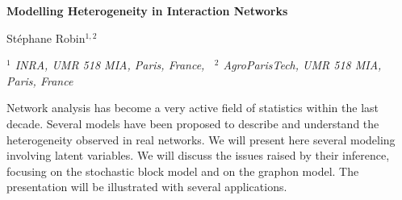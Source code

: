 \documentclass[11pt,a4paper]{article}
\newcommand{\abstracttitle}[1]{\begin{center} \begin{large} \textbf{#1} \end{large} \end{center}}
\newcommand{\authors}[1]{\begin{center} #1 \end{center}}
\newcommand{\affiliations}[1]{\begin{center} #1 \end{center}}
\begin{document}
\abstracttitle{Modelling Heterogeneity in Interaction Networks}
\authors{St\'ephane Robin{$^{1, 2}$}}
\affiliations{\it $^1$ INRA, UMR 518 MIA, Paris, France, \, $^2$ AgroParisTech, UMR 518 MIA, Paris, France}

Network analysis has become a very active field of statistics within the last decade. Several models have been proposed to describe and understand the heterogeneity observed in real networks. We will present here several modeling involving latent variables. We will discuss the issues raised by their inference, focusing on the stochastic block model and on the graphon model. The presentation will be illustrated with several applications.





%
\end{document}
